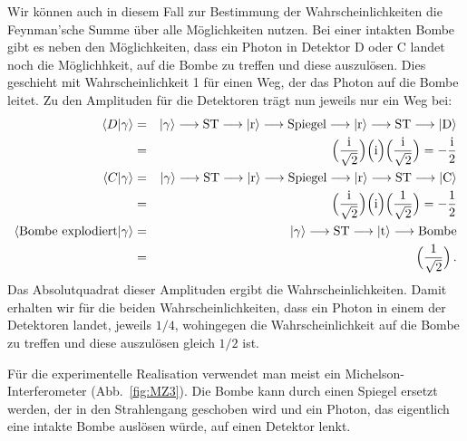 Wir k\"onnen auch in diesem Fall zur Bestimmung der Wahrscheinlichkeiten die Feynman'sche
Summe \"uber alle M\"oglichkeiten nutzen. Bei einer intakten Bombe gibt es neben den 
M\"oglichkeiten, dass ein Photon in Detektor D oder C landet noch die M\"oglichhkeit, auf die Bombe
zu treffen und diese auszul\"osen. Dies geschieht mit Wahrscheinlichkeit 1 f\"ur einen Weg, der das
Photon auf die Bombe leitet. Zu den Amplituden f\"ur die Detektoren tr\"agt nun jeweils nur ein Weg bei:
\begin{eqnarray}
\nonumber
     \langle D | \gamma \rangle &=&  |\gamma \rangle \longrightarrow \mbox{ST} \longrightarrow
       | {\rm r} \rangle \longrightarrow \mbox{Spiegel} \longrightarrow |{\rm r}\rangle \longrightarrow 
       \mbox{ST} \longrightarrow |{\rm D}\rangle  \\
     & =  &   \Big( \frac{\rm i}{\sqrt{2}}\Big) \Big( {\rm i} \Big) \Big( \frac{\rm i}{\sqrt{2}}\Big) 
       =   - \frac{\rm i}{2} \\
 \nonumber      
     \langle C | \gamma \rangle &=&  |\gamma \rangle \longrightarrow \mbox{ST} \longrightarrow
       | {\rm r} \rangle \longrightarrow \mbox{Spiegel} \longrightarrow |{\rm r}\rangle \longrightarrow 
       \mbox{ST} \longrightarrow |{\rm C}\rangle  \\
     & = &   \Big( \frac{\rm i}{\sqrt{2}}\Big)\Big( {\rm i}\Big)\Big( \frac{1}{\sqrt{2}} \Big)
      =   - \frac{1}{2}  \\
 \langle \mbox{Bombe explodiert}|\gamma \rangle &=& 
\nonumber 
         |\gamma \rangle \longrightarrow \mbox{ST} \longrightarrow
       | {\rm t} \rangle \longrightarrow  \mbox{Bombe}  \\
        &=&   \Big( \frac{1}{\sqrt{2}}\Big)  \, . 
\end{eqnarray}
Das Absolutquadrat dieser Amplituden ergibt die Wahrscheinlichkeiten. Damit erhalten wir f\"ur
die beiden Wahrscheinlichkeiten, dass ein Photon in einem der Detektoren landet, jeweils
$1/4$, wohingegen die Wahrscheinlichkeit auf die Bombe zu treffen und diese
auszul\"osen gleich $1/2$ ist. 

F\"ur die experimentelle Realisation verwendet man meist ein Michelson-Interferometer (Abb.\ \ref{fig:MZ3}).
Die Bombe kann durch einen Spiegel ersetzt werden, der in den Strahlengang geschoben wird
und ein Photon, das eigentlich eine intakte Bombe ausl\"osen w\"urde, auf einen Detektor lenkt. 


